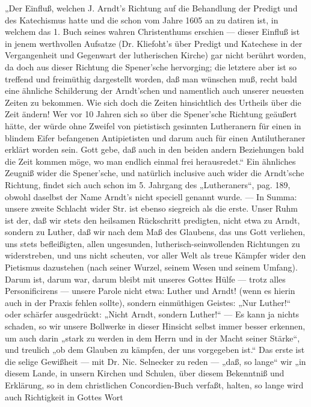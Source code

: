 „Der Einfluß, welchen J. Arndt’s Richtung auf die Behandlung der Predigt und des Katechismus hatte und
die schon vom Jahre 1605 an zu datiren ist, in welchem das 1. Buch seines wahren Christenthums erschien
— dieser Einfluß ist in jenem werthvollen Aufsatze (Dr. Kliefoht’s über Predigt und Katechese in
der Vergangenheit und Gegenwart der lutherischen Kirche) gar nicht berührt worden, da doch aus dieser
Richtung die Spener’sche hervorging; die letztere aber ist so treffend und freimüthig dargestellt
worden, daß man wünschen muß, recht bald eine ähnliche Schilderung der Arndt’schen und namentlich
auch unserer neuesten Zeiten zu bekommen. Wie sich doch die Zeiten hinsichtlich des Urtheils über die
Zeit ändern! Wer vor 10 Jahren sich so über die Spener’sche Richtung geäußert hätte, der würde
ohne Zweifel von pietistisch gesinnten Lutheranern für einen in blindem Eifer befangenen Antipietisten
und darum auch für einen Antilutheraner erklärt worden sein. Gott gebe, daß auch in den beiden andern
Beziehungen bald die Zeit kommen möge, wo man endlich einmal frei herausredet.“ Ein ähnliches Zeugniß
wider die Spener’sche, und natürlich inclusive auch wider die Arndt’sche Richtung, findet sich auch
schon im 5. Jahrgang des „Lutheraners“, pag. 189, obwohl daselbst der Name Arndt’s nicht speciell
genannt wurde. — In Summa: unsere zweite Schlacht wider Str. ist ebenso siegreich als die erste. Unser
Ruhm ist der, daß wir stets den
heilsamen Rückschritt predigten, nicht etwa zu Arndt, sondern zu Luther, daß
wir nach dem Maß des Glaubens, das uns Gott verliehen, uns stets befleißigten, allen ungesunden,
lutherisch-seinwollenden Richtungen zu widerstreben, und uns nicht scheuten, vor aller Welt als treue
Kämpfer wider den Pietismus dazustehen (nach seiner Wurzel, seinem Wesen und seinem Umfang). Darum ist,
darum war, darum bleibt mit unseres Gottes Hülfe — trotz alles Personificirens — unsere Parole nicht
etwa: Luther und Arndt! (wenn es hierin auch in der Praxis fehlen sollte), sondern einmüthigen Geistes:
„Nur Luther!“ oder schärfer ausgedrückt: „Nicht Arndt, sondern Luther!“ — Es kann ja nichts
schaden, so wir unsere Bollwerke in dieser Hinsicht selbst immer besser erkennen, um auch darin „stark
zu werden in dem Herrn und in der Macht seiner Stärke“, und treulich „ob dem Glauben zu kämpfen, der
uns vorgegeben ist.“ Das erste ist die selige Gewißheit — mit Dr. Nic. Selnecker zu reden — „daß,
so lange“ wir „in diesem Lande, in unsern Kirchen und Schulen, über diesem Bekenntniß und Erklärung,
so in dem christlichen Concordien-Buch verfaßt, halten, so lange wird auch Richtigkeit in Gottes Wort
